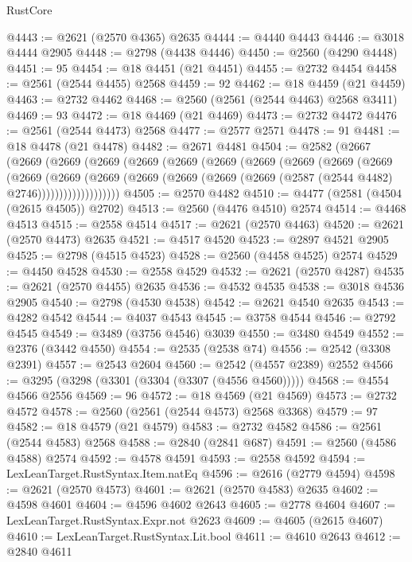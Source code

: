 \begin{lexlean}{RustCore}
\begin{coremodule}
@4443 := @2621 (@2570 @4365) @2635
@4444 := @4440 @4443
@4446 := @3018 @4444 @2905
@4448 := @2798 (@4438 @4446)
@4450 := @2560 (@4290 @4448)
@4451 := 95
@4454 := @18 @4451 (@21 @4451)
@4455 := @2732 @4454
@4458 := @2561 (@2544 @4455) @2568
@4459 := 92
@4462 := @18 @4459 (@21 @4459)
@4463 := @2732 @4462
@4468 := @2560 (@2561 (@2544 @4463) @2568 @3411)
@4469 := 93
@4472 := @18 @4469 (@21 @4469)
@4473 := @2732 @4472
@4476 := @2561 (@2544 @4473) @2568
@4477 := @2577 @2571
@4478 := 91
@4481 := @18 @4478 (@21 @4478)
@4482 := @2671 @4481
@4504 := @2582
    (@2667
      (@2669
        (@2669
          (@2669
            (@2669
              (@2669
                (@2669
                  (@2669
                    (@2669
                      (@2669
                        (@2669
                          (@2669
                            (@2669
                              (@2669
                                (@2669
                                  (@2669 (@2669 (@2669 (@2587 (@2544 @4482) @2746)))))))))))))))))))
@4505 := @2570 @4482
@4510 := @4477 (@2581 (@4504 (@2615 @4505)) @2702)
@4513 := @2560 (@4476 @4510) @2574
@4514 := @4468 @4513
@4515 := @2558 @4514
@4517 := @2621 (@2570 @4463)
@4520 := @2621 (@2570 @4473) @2635
@4521 := @4517 @4520
@4523 := @2897 @4521 @2905
@4525 := @2798 (@4515 @4523)
@4528 := @2560 (@4458 @4525) @2574
@4529 := @4450 @4528
@4530 := @2558 @4529
@4532 := @2621 (@2570 @4287)
@4535 := @2621 (@2570 @4455) @2635
@4536 := @4532 @4535
@4538 := @3018 @4536 @2905
@4540 := @2798 (@4530 @4538)
@4542 := @2621 @4540 @2635
@4543 := @4282 @4542
@4544 := @4037 @4543
@4545 := @3758 @4544
@4546 := @2792 @4545
@4549 := @3489 (@3756 @4546) @3039
@4550 := @3480 @4549
@4552 := @2376 (@3442 @4550)
@4554 := @2535 (@2538 @74)
@4556 := @2542 (@3308 @2391)
@4557 := @2543 @2604
@4560 := @2542 (@4557 @2389) @2552
@4566 := @3295 (@3298 (@3301 (@3304 (@3307 (@4556 @4560)))))
@4568 := @4554 @4566 @2556
@4569 := 96
@4572 := @18 @4569 (@21 @4569)
@4573 := @2732 @4572
@4578 := @2560 (@2561 (@2544 @4573) @2568 @3368)
@4579 := 97
@4582 := @18 @4579 (@21 @4579)
@4583 := @2732 @4582
@4586 := @2561 (@2544 @4583) @2568
@4588 := @2840 (@2841 @687)
@4591 := @2560 (@4586 @4588) @2574
@4592 := @4578 @4591
@4593 := @2558 @4592
@4594 := LexLeanTarget.RustSyntax.Item.natEq
@4596 := @2616 (@2779 @4594)
@4598 := @2621 (@2570 @4573)
@4601 := @2621 (@2570 @4583) @2635
@4602 := @4598 @4601
@4604 := @4596 @4602 @2643
@4605 := @2778 @4604
@4607 := LexLeanTarget.RustSyntax.Expr.not @2623
@4609 := @4605 (@2615 @4607)
@4610 := LexLeanTarget.RustSyntax.Lit.bool
@4611 := @4610 @2643
@4612 := @2840 @4611

\end{coremodule}
\end{lexlean}
